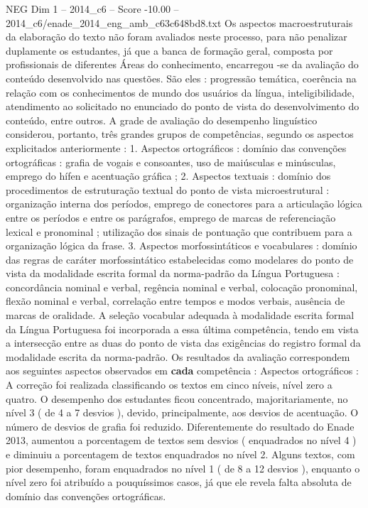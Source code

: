 \begin{textsample}{NEG Dim 1 – 2014\_c6 – Score -10.00 – 2014\_c6/enade\_2014\_eng\_amb\_c63c648bd8.txt}
Os aspectos macroestruturais da elaboração do texto não foram avaliados neste processo, para não penalizar duplamente os estudantes, já que a banca de formação geral, composta por profissionais de diferentes Áreas do conhecimento, encarregou -se da avaliação do conteúdo desenvolvido nas questões.
São eles : progressão temática, coerência na relação com os conhecimentos de mundo dos usuários da língua, inteligibilidade, atendimento ao solicitado no enunciado do ponto de vista do desenvolvimento do conteúdo, entre outros.
A grade de avaliação do desempenho linguístico considerou, portanto, três grandes grupos de competências, segundo os aspectos explicitados anteriormente : 1.
Aspectos ortográficos : domínio das convenções ortográficas : grafia de vogais e consoantes, uso de maiúsculas e minúsculas, emprego do hífen e acentuação gráfica ; 2.
Aspectos textuais : domínio dos procedimentos de estruturação textual do ponto de vista microestrutural : organização interna dos períodos, emprego de conectores para a articulação lógica entre os períodos e entre os parágrafos, emprego de marcas de referenciação lexical e pronominal ; utilização dos sinais de pontuação que contribuem para a organização lógica da frase. 3.
Aspectos morfossintáticos e vocabulares : domínio das regras de caráter morfossintático estabelecidas como modelares do ponto de vista da modalidade escrita formal da norma-padrão da Língua Portuguesa : concordância nominal e verbal, regência nominal e verbal, colocação pronominal, flexão nominal e verbal, correlação entre tempos e modos verbais, ausência de marcas de oralidade.
A seleção vocabular adequada à modalidade escrita formal da Língua Portuguesa foi incorporada a essa última competência, tendo em vista a intersecção entre as duas do ponto de vista das exigências do registro formal da modalidade escrita da norma-padrão.
Os resultados da avaliação correspondem aos seguintes aspectos observados em \textbf{cada} competência : Aspectos ortográficos : A correção foi realizada classificando os textos em cinco níveis, nível zero a quatro.
O desempenho dos estudantes ficou concentrado, majoritariamente, no nível 3 ( de 4 a 7 desvios ), devido, principalmente, aos desvios de acentuação.
O número de desvios de grafia foi reduzido.
Diferentemente do resultado do Enade 2013, aumentou a porcentagem de textos sem desvios ( enquadrados no nível 4 ) e diminuiu a porcentagem de textos enquadrados no nível 2.
Alguns textos, com pior desempenho, foram enquadrados no nível 1 ( de 8 a 12 desvios ), enquanto o nível zero foi atribuído a pouquíssimos casos, já que ele revela falta absoluta de domínio das convenções ortográficas.

\end{textsample}
